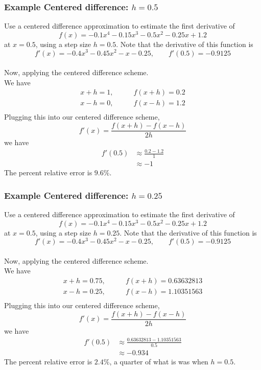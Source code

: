 \documentclass{if-beamer}
\begin{document}
\begin{frame}
\frametitle{Example Centered difference: $h= 0.5$}
Use a centered difference approximation to estimate the first derivative of
$$f(x) = -0.1x^4-0.15x^3-0.5x^2-0.25x+1.2 $$
at $x=0.5$, using a step size $h = 0.5$. Note that the derivative of this function is
$$f'(x) = -0.4x^3-0.45x^2-x-0.25, \qquad f'(0.5) = -0.9125$$
\\\vspace{5pt}
Now, applying the centered difference scheme.\\\vspace{5pt}
We have
\begin{align*}
x+h = 1, \qquad &f(x+h) = 0.2\\
x-h = 0, \qquad &f(x-h) = 1.2\\
\end{align*}
Plugging this into our centered difference scheme, 
$$f'(x) = \frac{f(x+h)-f(x-h)}{2h} $$
we have
\begin{align*}
f'(0.5) &\approx \frac{0.2-1.2}{1} \\
&\approx -1
\end{align*}
The percent relative error is $9.6\%$.
\end{frame}

\begin{frame}
\frametitle{Example Centered difference: $h= 0.25$}
Use a centered difference approximation to estimate the first derivative of
$$f(x) = -0.1x^4-0.15x^3-0.5x^2-0.25x+1.2 $$
at $x=0.5$, using a step size $h = 0.25$. Note that the derivative of this function is
$$f'(x) = -0.4x^3-0.45x^2-x-0.25, \qquad f'(0.5) = -0.9125$$
\\\vspace{5pt}
Now, applying the centered difference scheme.\\\vspace{5pt}
We have
\begin{align*}
x+h = 0.75, \qquad &f(x+h) = 0.63632813\\
x-h = 0.25, \qquad &f(x-h) = 1.10351563\\
\end{align*}
Plugging this into our centered difference scheme, 
$$f'(x) = \frac{f(x+h)-f(x-h)}{2h} $$
we have
\begin{align*}
f'(0.5) &\approx \frac{0.63632813-1.10351563}{0.5} \\
&\approx -0.934
\end{align*}
The percent relative error is $2.4\%$, a quarter of what is was when $h=0.5$.
\end{frame}
\end{document}
